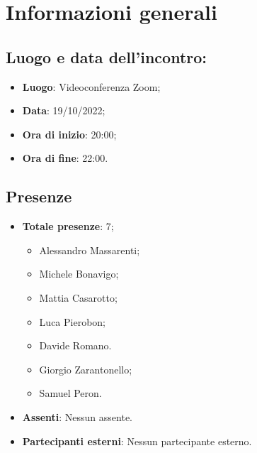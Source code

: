 \section{Informazioni generali}
    \subsection{Luogo e data dell'incontro:}
    \begin{itemize}
        \item \textbf{Luogo}: Videoconferenza Zoom;
        \item \textbf{Data}: 19/10/2022;
        \item \textbf{Ora di inizio}: 20:00;
        \item \textbf{Ora di fine}: 22:00.
    \end{itemize}
    \subsection{Presenze}
    \begin{itemize}
        \item \textbf{Totale presenze}: 7;
        \begin{itemize}
            \item Alessandro Massarenti;
            \item Michele Bonavigo;
            \item Mattia Casarotto;
            \item Luca Pierobon;
            \item Davide Romano.
            \item Giorgio Zarantonello;
            \item Samuel Peron.
        \end{itemize}
        \item \textbf{Assenti}: Nessun assente.
        \item \textbf{Partecipanti esterni}: Nessun partecipante esterno.
    \end{itemize}
